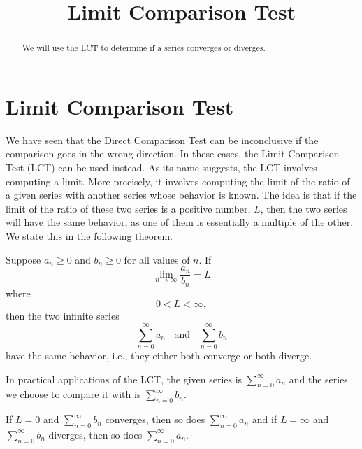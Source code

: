 \documentclass{ximera}
\title{Limit Comparison Test}
\begin{document}
\begin{abstract}
We will use the LCT to determine if a series converges or diverges.
\end{abstract}

\maketitle

\section{Limit Comparison Test}
We have seen that the Direct Comparison Test can be inconclusive if the comparison goes in the wrong direction. 
In these cases, the Limit Comparison Test (LCT) can be used instead.
As its name suggests, the LCT involves computing a limit. More precisely, it involves computing the limit of the ratio of a given series with 
another series whose behavior is known.  The idea is that if the limit of the ratio of these two series is a positive number, $L$, then the two series
will have the same behavior, as one of them is essentially a multiple of the other. We state this in the following theorem.

\begin{theorem}
Suppose $a_n \geq 0$ and $b_n \geq 0$ for all values of $n$.
If 
\[
\lim_{n \to \infty} \frac{a_n}{b_n} = L
\]
where
\[
0<L<\infty,
\]
then the two infinite series 
\[
\sum_{n=0}^\infty a_n \;\; \text{ and } \;\; \sum_{n=0}^\infty b_n
\]
have the same behavior, i.e., they either both converge or both diverge.
\end{theorem}


\begin{remark}
In practical applications of the LCT, the given series is $\displaystyle{\sum_{n=0}^\infty a_n}$
and the series we choose to compare it with is $\displaystyle{\sum_{n=0}^\infty b_n}$.
\end{remark}


\begin{remark}
If $L = 0$ and $\displaystyle{\sum_{n=0}^\infty b_n}$ converges, then so does $\displaystyle{\sum_{n=0}^\infty a_n}$
and if $L = \infty$ and $\displaystyle{\sum_{n=0}^\infty b_n}$ diverges, then so does $\displaystyle{\sum_{n=0}^\infty a_n}$.
\end{remark}
\end{document}
